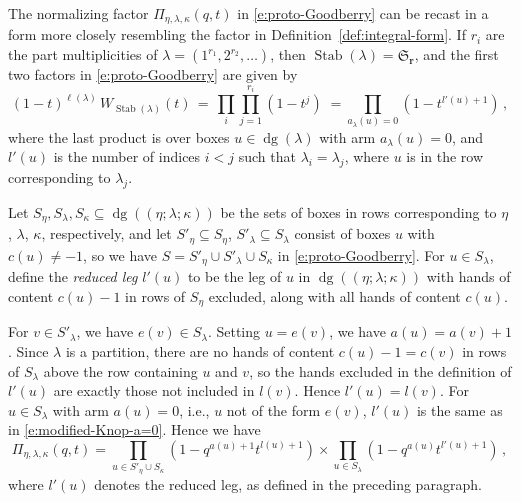 \documentclass[12pt]{amsart}
\theoremstyle{definition}
\theoremstyle{remark}
\newcommand{\rr}{{\mathbf r}}
\newcommand{\Sfrak}{{\mathfrak S}}
\DeclareMathOperator{\dg}{dg}
\DeclareMathOperator{\Stab}{Stab}
\begin{document}
The normalizing factor $\Pi _{\eta ,\lambda ,\kappa }(q,t)$ in
\eqref{e:proto-Goodberry} can be recast in a form more closely
resembling the factor in Definition~\ref{def:integral-form}.  If
$r_{i}$ are the part multiplicities of $\lambda = (1^{r_{1}},
2^{r_{2}},\ldots )$, then $\Stab (\lambda ) = \Sfrak _{\rr }$, and the
first two factors in \eqref{e:proto-Goodberry} are given by
\begin{equation}\label{e:modified-Knop-a=0}
(1-t)^{\ell (\lambda )} \, W_{\Stab (\lambda )}(t) \, = \, \prod _{i}
\prod _{j=1}^{r_{i}} (1-t^{j})\; = \!  \prod _{a_{\lambda }(u) = 0}
(1-t^{l'(u)+1})\, ,
\end{equation}
where the last product is over boxes $u\in \dg (\lambda )$ with arm
$a_{\lambda }(u) = 0$, and $l'(u)$ is the number of indices $i<j$ such
that $\lambda _{i} = \lambda _{j}$, where $u$ is in the row
corresponding to $\lambda _{j}$.

Let $S_{\eta }, S_{\lambda }, S_{\kappa }\subseteq \dg ((\eta ;\lambda
;\kappa ))$ be the sets of boxes in rows corresponding to $\eta $,
$\lambda $, $\kappa $, respectively, and let $S'_{\eta }\subseteq
S_{\eta }$, $S'_{\lambda }\subseteq S_{\lambda }$ consist of boxes $u$
with $c(u)\not =-1$, so we have $S = S'_{\eta }\cup S'_{\lambda }\cup
S_{\kappa }$ in \eqref{e:proto-Goodberry}.  For $u\in S_{\lambda }$,
define the {\em reduced leg} $l'(u)$ to be the leg of $u$ in $\dg
((\eta ;\lambda ;\kappa ))$ with hands of content $c(u)-1$ in rows of
$S_{\eta } $ excluded, along with all hands of content $c(u)$.

For $v\in S'_{\lambda }$, we have $e(v)\in S_{\lambda }$.  Setting
$u=e(v)$, we have $a(u) = a(v)+1$.  Since $\lambda $ is a partition,
there are no hands of content $c(u)-1=c(v)$ in rows of $S_{\lambda }$
above the row containing $u$ and $v$, so the hands excluded in the
definition of $l'(u)$ are exactly those not included in $l(v)$. Hence
$l'(u) = l(v)$.  For $u\in S_{\lambda }$ with arm $a(u) = 0$, i.e.,
$u$ not of the form $e(v)$, $l'(u)$ is the same as in
\eqref{e:modified-Knop-a=0}. Hence we have
\begin{equation}\label{e:Goodberry}
\Pi _{\eta ,\lambda ,\kappa }(q,t) = \prod _{u\in S'_{\eta }\cup
S_{\kappa }} (1-q^{a(u)+1} t^{l(u)+1})\times \prod _{u\in S_{\lambda
}} (1-q^{a(u)} t^{l'(u)+1})\, ,
\end{equation}
where $l'(u)$ denotes the reduced leg, as defined in the preceding
paragraph.
\end{document}

